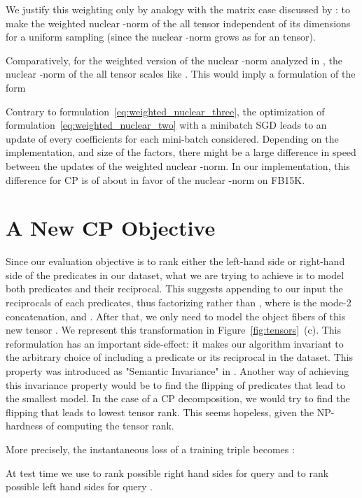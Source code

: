 \documentclass{article}
\newcommand{\CP}{{CP}\xspace}
\newcommand{\fb}{{FB15K}\xspace}
\begin{document}
We justify this weighting only by analogy with the matrix case discussed by \citep{srebro_collaborative_2010}: to make the weighted nuclear -norm of the all  tensor independent of its dimensions for a uniform sampling (since the nuclear -norm grows as  for an  tensor).

Comparatively, for the weighted version of the nuclear -norm analyzed in \citet{yuan_tensor_2016}, the nuclear -norm of the all  tensor scales like . This would imply a formulation of the form


Contrary to formulation~\eqref{eq:weighted_nuclear_three}, the optimization of formulation~\eqref{eq:weighted_nuclear_two} with a minibatch SGD leads to an update of every coefficients for each mini-batch considered. Depending on the implementation, and size of the factors, there might be a large difference in speed between the updates of the weighted nuclear -norm. In our implementation, this difference for \CP is of about  in favor of the nuclear -norm on \fb.


\section{A New \CP Objective}
Since our evaluation objective is to rank either the left-hand side or right-hand side of the predicates in our dataset, what we are trying to achieve is to model both predicates and their reciprocal. This suggests appending to our input the reciprocals of each predicates, thus factorizing  rather than , where  is the mode-2 concatenation, and . After that, we only need to model the object fibers of this new tensor . We represent this transformation in Figure~\ref{fig:tensors}~(c). This reformulation has an important side-effect: it makes our algorithm invariant to the arbitrary choice of including a predicate or its reciprocal in the dataset. This property was introduced as "Semantic Invariance" in \citet{bailly_semantically_2015}. 
Another way of achieving this invariance property would be to find the flipping of predicates that lead to the smallest model. In the case of a CP decomposition, we would try to find the flipping that leads to lowest tensor rank. This seems hopeless, given the NP-hardness of computing the tensor rank.

More precisely, the instantaneous loss of a training triple  becomes :

At test time we use  to rank possible right hand sides for query  and  to rank possible left hand sides for query .
\end{document}
